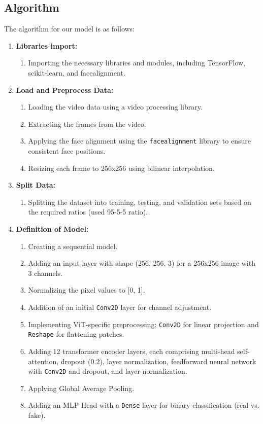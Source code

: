 \subsection{Algorithm}
The algorithm  for our model is as follows:

\begin{enumerate}
   \item \textbf{Libraries import:}
         \begin{enumerate}
            \item Importing the necessary libraries and modules, including TensorFlow, scikit-learn, and facealignment.
         \end{enumerate}

   \item \textbf{Load and Preprocess Data:}
         \begin{enumerate}
            \item Loading the video data using a video processing library.
            \item Extracting the frames from the video.
            \item Applying the face alignment using the \texttt{facealignment} library to ensure consistent face positions.
            \item Resizing each frame to 256x256 using bilinear interpolation.
         \end{enumerate}

   \item \textbf{Split Data:}
         \begin{enumerate}
            \item Splitting the dataset into training, testing, and validation sets based on the required ratios (used 95-5-5 ratio).
         \end{enumerate}

   \item \textbf{Definition of Model:}
         \begin{enumerate}
            \item Creating a sequential model.
            \item Adding an input layer with shape (256, 256, 3) for a 256x256 image with 3 channels.
            \item Normalizing the pixel values to [0, 1].
            \item Addition of an initial \texttt{Conv2D} layer for channel adjustment.
            \item Implementing ViT-specific preprocessing: \texttt{Conv2D} for linear projection and \texttt{Reshape} for flattening patches.
            \item Adding 12 transformer encoder layers, each comprising multi-head self-attention, dropout (0.2), layer normalization, feedforward neural network with \texttt{Conv2D} and dropout, and layer normalization.
            \item Applying Global Average Pooling.
            \item Adding an MLP Head with a \texttt{Dense} layer for binary classification (real vs. fake).
         \end{enumerate}


\end{enumerate}
